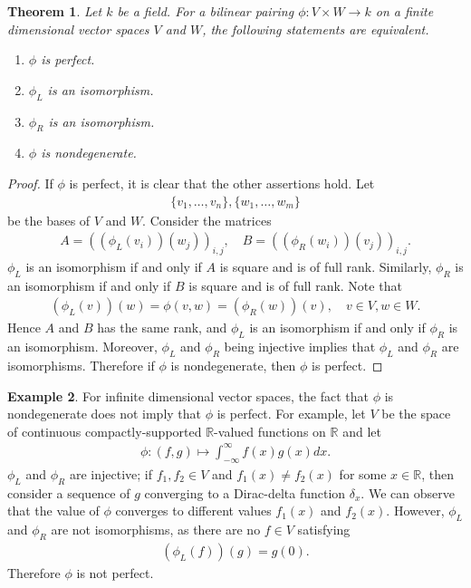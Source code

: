 \documentclass[12pt]{report}
\theoremstyle{plain}
\newtheorem{theorem}{Theorem}[section]
\theoremstyle{remark}
\theoremstyle{definition}
\newtheorem{example}[theorem]{Example}
\newcommand{\R}{\mathbb{R}}
\begin{document}
\begin{theorem}
    Let $k$ be a field. For a bilinear pairing $\phi:V\times W\rightarrow k$ on a finite dimensional vector spaces $V$ and $W$, the following statements are equivalent.
    \begin{enumerate}
        \item $\phi$ is perfect.
        \item $\phi_L$ is an isomorphism.
        \item $\phi_R$ is an isomorphism.
        \item $\phi$ is nondegenerate.
    \end{enumerate}
\end{theorem}
\begin{proof}
    If $\phi$ is perfect, it is clear that the other assertions hold. Let
    \begin{align*}
        \{v_1,\dots,v_n\},\{w_1,\dots,w_m\}
    \end{align*}
    be the bases of $V$ and $W$. Consider the matrices
    \begin{align*}
        A = ((\phi_L(v_i))(w_j))_{i,j},\quad B=((\phi_R(w_i))(v_j))_{i,j}.
    \end{align*}
    $\phi_L$ is an isomorphism if and only if $A$ is square and is of full rank. Similarly, $\phi_R$ is an isomorphism if and only if $B$ is square and is of full rank. Note that
    \begin{align*}
        (\phi_L(v))(w) = \phi(v,w) = (\phi_R(w))(v),\quad v\in V,w\in W.
    \end{align*}
    Hence $A$ and $B$ has the same rank, and $\phi_L$ is an isomorphism if and only if $\phi_R$ is an isomorphism. Moreover, $\phi_L$ and $\phi_R$ being injective implies that $\phi_L$ and $\phi_R$ are isomorphisms. Therefore if $\phi$ is nondegenerate, then $\phi$ is perfect.
\end{proof}

\begin{example}
    For infinite dimensional vector spaces, the fact that $\phi$ is nondegenerate does not imply that $\phi$ is perfect. For example, let $V$ be the space of continuous compactly-supported $\R$-valued functions on $\R$ and let
    \begin{align*}
        \phi:(f,g)\mapsto \int_{-\infty}^\infty f(x)g(x)dx.
    \end{align*}
    $\phi_L$ and $\phi_R$ are injective; if $f_1,f_2\in V$  and $f_1(x)\neq f_2(x)$ for some $x\in \R$, then consider a sequence of $g$ converging to a Dirac-delta function $\delta_x$. We can observe that the value of $\phi$ converges to different values $f_1(x)$ and $f_2(x)$. However, $\phi_L$ and $\phi_R$ are not isomorphisms, as there are no $f\in V$ satisfying
    \begin{align*}
        (\phi_L(f))(g) = g(0).
    \end{align*}
    Therefore $\phi$ is not perfect.
\end{example}
\end{document}
